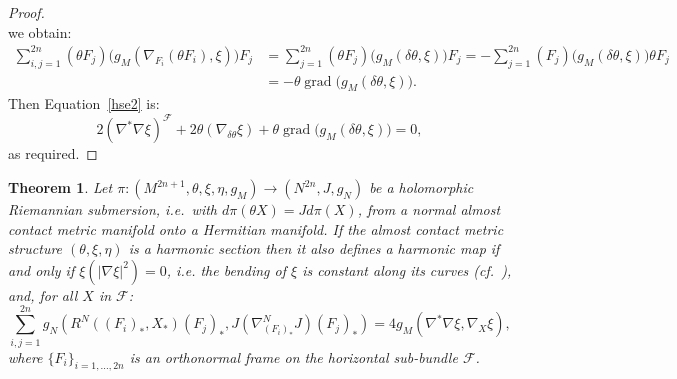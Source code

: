 \documentclass[a4paper,reqno]{amsart}
\newtheorem{theorem}[thm]{Theorem}
\theoremstyle{definition}
\theoremstyle{remark}
\theoremstyle{plain}
\numberwithin{equation}{section}
\def\grad{\operatorname {grad}}
\newcommand{\f}{\mathcal{F}}
\begin{document}
\begin{proof}
\begin{equation*}
\end{equation*}
we obtain:
\begin{align*}
  \sum_{i,j=1}^{2n}(\theta F_j)\big( g_M(\nabla_{F_i} (\theta F_i ),\xi)\big) F_j 
& = \sum_{j=1}^{2n}(\theta F_j)\big( g_M(\delta \theta ,\xi)\big)
  F_j
  = -\sum_{j=1}^{2n}( F_j)\big( g_M(\delta \theta ,\xi)\big) \theta F_j 
 \\ & = -\theta \grad \big(  g_M(\delta \theta ,\xi)\big).
\end{align*}
Then Equation~\eqref{hse2} is:
$$
2(\nabla^{*}\nabla \xi )^{\f} +2 \theta(\nabla_{\delta \theta} \xi)
+\theta\grad \big( g_M(\delta \theta ,\xi)\big)=0,
$$
as required.
\end{proof}


\begin{theorem} \label{thm4.1-harm} Let
  $\pi: (M^{2n+1},\theta, \xi, \eta, g_M)\longrightarrow
  (N^{2n}, J, g_N)$ be a holomorphic Riemannian
  submersion, i.e.~with $d\pi (\theta X) =  J d\pi (X)$,
  from a normal almost contact metric manifold onto a Hermitian
  manifold. If the almost contact metric structure $(\theta, \xi, \eta)$ is a harmonic
  section then it also defines a harmonic map if and
  only if $\xi(\vert \nabla \xi\vert^2)=0$, i.e. the bending of $\xi$ is constant along its curves (cf.~\cite{Wiegmink}), and, for all $X$ in
  $\f$:
  $$
  \sum_{i,j=1}^{2n} g_N(  R^N((F_i)_*, X_* )(F_j)_* ,  J(\nabla^N_{(F_i)_*}  J)(F_{j})_*) = 4 g_M(\nabla^* \nabla \xi ,  \nabla_{X}\xi),
$$
where $\{F_i\}_{i=1,\dots, 2n}$ is an orthonormal frame on the
horizontal sub-bundle $\f$.
\end{theorem}
\end{document}

